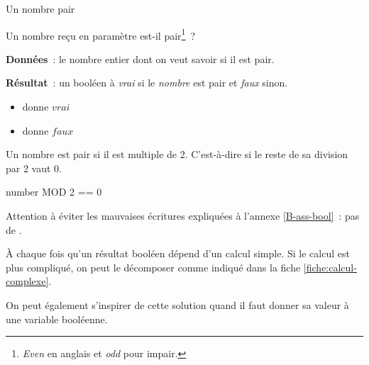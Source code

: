 \begin{Fiche}{Un nombre pair}
\label{fiche:calcul-pair}

Un nombre reçu en paramètre est-il pair\footnote{\textit{Even} en anglais et \textit{odd} pour impair.}~?


	\textbf{Données}~: le nombre entier dont on veut savoir si il est pair.
		
	\textbf{Résultat}~: un booléen à \textit{vrai} si le \textit{nombre} est pair et \textit{faux} sinon.

	\begin{center}	
	\end{center}


	\begin{itemize}
	\item {} donne $vrai$
	\item {} donne $faux$
	\end{itemize}
	

	Un nombre est pair si il est multiple de 2. 
	C’est-à-dire si le reste de sa division par 2 vaut 0.

	\begin{pseudocode}
			\Return number MOD 2 == 0
		\EndAlgo
	\end{pseudocode}

	Attention à éviter les mauvaises écritures expliquées à l’annexe
	\vref{B-ass-bool}~: pas de .
	

	À chaque fois qu’un résultat booléen dépend d’un calcul simple.
	Si le calcul est plus compliqué, on peut le décomposer comme
	indiqué dans la fiche \vref{fiche:calcul-complexe}.
	
	On peut également s’inspirer de cette solution
	quand il faut donner sa valeur à une variable booléenne.
		
\end{Fiche}
